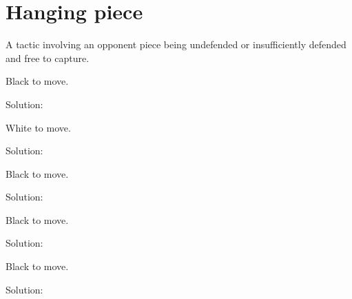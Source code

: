 \documentclass{book}
\begin{document}
\section{Hanging piece}
A tactic involving an opponent piece being undefended or insufficiently defended and free to capture.\begin{multicols}{2} 
\begin{samepage} 
\newgame 


 
\showboard
 
 Black to move. 
 
Solution: 
 
\end{samepage}\begin{samepage} 
\newgame 


 
\showboard
 
 White to move. 
 
Solution: 
 
\end{samepage}\begin{samepage} 
\newgame 


 
\showboard
 
 Black to move. 
 
Solution: 
 
\end{samepage}\begin{samepage} 
\newgame 


 
\showboard
 
 Black to move. 
 
Solution: 
 
\end{samepage}\begin{samepage} 
\newgame 


 
\showboard
 
 Black to move. 
 
Solution: 
 
\end{samepage}\end{multicols} 
\newpage 
\end{document}
